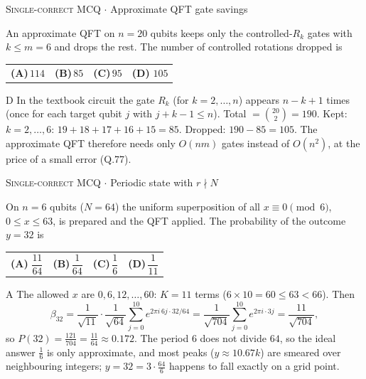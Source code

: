\documentclass[11pt,a4paper]{article}
\newcommand{\optlabel}[1]{\textbf{(#1)}}
\newcommand{\correctlabel}[1]{\textcolor{okgreen}{\textbf{(#1)}\,\ding{51}}}
\newenvironment{qitem}[1]{\begin{list}{}{\setlength{\leftmargin}{3.3em}\setlength{\labelwidth}{3.1em}%
  \setlength{\labelsep}{0.2em}\setlength{\topsep}{3pt}\setlength{\parsep}{3pt}}\item[\textbf{Q.#1}\hfill]}{\end{list}}
\newcommand{\qsep}{\par\vspace{2pt}{\color{black!15}\hrule}\vspace{4pt}}
\newcommand{\qmeta}[2]{{\footnotesize\color{black!60}\textsc{#1} \;$\cdot$\; #2}\par}
\begin{document}
\begin{qitem}{71}
\qmeta{Single-correct MCQ}{Approximate QFT gate savings}
An approximate QFT on $n = 20$ qubits keeps only the controlled-$R_k$ gates with $k \le m = 6$ and drops the rest.
The number of controlled rotations dropped is
\par\smallskip\noindent\begin{tabularx}{\linewidth}{@{}*{4}{L}@{}}
\optlabel{A}\,$114$ & \optlabel{B}\,$85$ & \optlabel{C}\,$95$ & \correctlabel{D}\,$105$
\end{tabularx}
\end{qitem}
\begin{solbox}{D}
In the textbook circuit the gate $R_k$ (for $k = 2, \dots, n$) appears $n - k + 1$ times (once for each target qubit $j$
with $j + k - 1 \le n$). Total $= \binom{20}{2} = 190$. Kept: $k = 2, \dots, 6$: $19 + 18 + 17 + 16 + 15 = 85$. Dropped:
$190 - 85 = 105$. The approximate QFT therefore needs only $O(nm)$ gates instead of $O(n^2)$, at the price of a small error
(Q.77).
\end{solbox}
\qsep

\begin{qitem}{72}
\qmeta{Single-correct MCQ}{Periodic state with $r\nmid N$}
On $n = 6$ qubits ($N = 64$) the uniform superposition of all $x \equiv 0 \pmod 6$, $0 \le x \le 63$, is prepared and the
QFT applied. The probability of the outcome $y = 32$ is
\par\smallskip\noindent\begin{tabularx}{\linewidth}{@{}*{4}{L}@{}}
\correctlabel{A}\,$\dfrac{11}{64}$ & \optlabel{B}\,$\dfrac{1}{64}$ & \optlabel{C}\,$\dfrac16$ & \optlabel{D}\,$\dfrac{1}{11}$
\end{tabularx}
\end{qitem}
\begin{solbox}{A}
The allowed $x$ are $0, 6, 12, \dots, 60$: $K = 11$ terms ($6\times10 = 60 \le 63 < 66$). Then
\[ \beta_{32} = \frac{1}{\sqrt{11}}\cdot\frac{1}{\sqrt{64}}\sum_{j=0}^{10}e^{2\pi i\,6j\cdot32/64} = \frac{1}{\sqrt{704}}\sum_{j=0}^{10}e^{2\pi i\cdot3j}
   = \frac{11}{\sqrt{704}}, \]
so $P(32) = \frac{121}{704} = \frac{11}{64} \approx 0.172$. The period $6$ does not divide $64$, so the ideal answer $\frac16$ is
only approximate, and most peaks ($y \approx 10.67k$) are smeared over neighbouring integers; $y = 32 = 3\cdot\frac{64}{6}$
happens to fall exactly on a grid point.
\end{solbox}
\qsep
\end{document}
